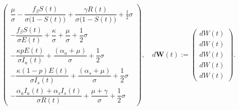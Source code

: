 \begin{frame}
\begin{textblock*}{120mm}
{{\begin{equation*}
					\begin{pmatrix}
						\dfrac{\mu}{\sigma } -
						\dfrac{f_\beta S(t) }{\sigma \big(1-S(t)\big)}
						+
						\dfrac{\gamma R(t)}{\sigma \big(1-S(t)\big)}
						+ \tfrac{1}{2} \sigma
						\\
						- \dfrac{f_\beta  S(t)  }{\sigma E(t)}
						+ \dfrac{ \kappa   }{\sigma }
						+ \dfrac{\mu }{\sigma }
						+ \dfrac{1}{2} \sigma
						\\
						- \dfrac{\kappa p E(t)}{\sigma I_a(t)}
						+ \dfrac{(\alpha_a + \mu )}{\sigma }
						+ \dfrac{1}{2} \sigma
						\\
						- \dfrac{\kappa (1-p) E(t)}{\sigma I_s(t)}
						+ \dfrac{(\alpha_s + \mu )}{\sigma }
						+ \dfrac{1}{2} \sigma
						\\
						- \dfrac{\alpha_a I_a(t) +
							\alpha_s I_s(t)}{\sigma
							R(t)}
						+ \dfrac{\mu + \gamma}{\sigma }
						+ \dfrac{1}{2} \sigma
					\end{pmatrix},
					\quad
					d\mathbf{W}(t):=
					\begin{pmatrix}
						dW(t)
						\\
						dW(t)
						\\
						dW(t)
						\\
						dW(t)
						\\
						dW(t)
					\end{pmatrix} .
				\end{equation*}
			}
		}
	\end{textblock*}
\end{frame}